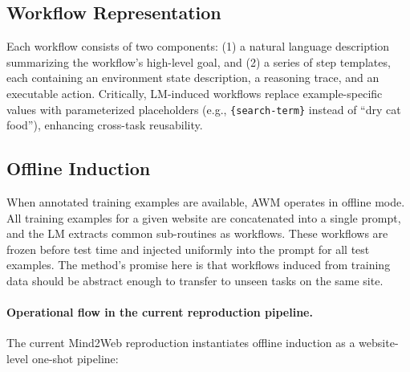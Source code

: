 \documentclass{article}
\begin{document}
\subsection{Workflow
Representation}\label{workflow-representation}

Each workflow consists of two components: (1) a natural language
description summarizing the workflow's high-level goal, and (2) a series
of step templates, each containing an environment state description, a
reasoning trace, and an executable action. Critically, LM-induced
workflows replace example-specific values with parameterized
placeholders (e.g., \texttt{\{search-term\}} instead of ``dry cat
food''), enhancing cross-task reusability.

\subsection{Offline Induction}\label{offline-induction}

When annotated training examples are available, AWM operates in offline
mode. All training examples for a given website are concatenated into a
single prompt, and the LM extracts common sub-routines as workflows.
These workflows are frozen before test time and injected uniformly into
the prompt for all test examples. The method's promise here is that
workflows induced from training data should be abstract enough to
transfer to unseen tasks on the same site.

\paragraph{Operational flow in the current reproduction pipeline.}
The current Mind2Web reproduction instantiates offline induction as a
website-level one-shot pipeline:
\end{document}

